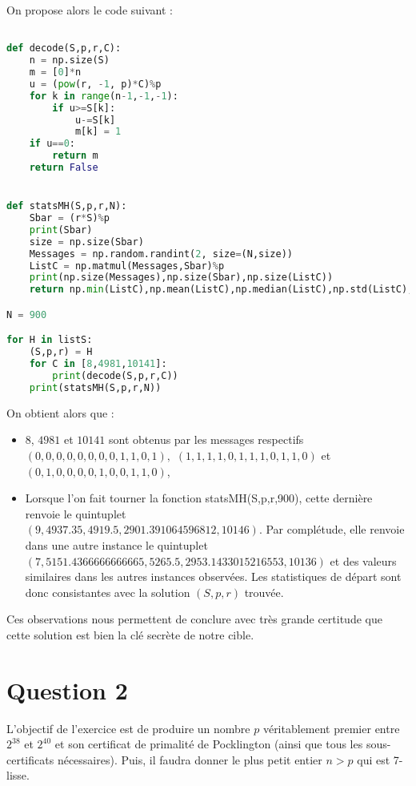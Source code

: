 \documentclass{article}
\begin{document}
On propose alors le code suivant :

\begin{lstlisting}[language = Python]

def decode(S,p,r,C):
    n = np.size(S)
    m = [0]*n
    u = (pow(r, -1, p)*C)%p
    for k in range(n-1,-1,-1):
        if u>=S[k]:
            u-=S[k]
            m[k] = 1
    if u==0:
        return m
    return False


def statsMH(S,p,r,N):
    Sbar = (r*S)%p
    print(Sbar)
    size = np.size(Sbar)
    Messages = np.random.randint(2, size=(N,size))
    ListC = np.matmul(Messages,Sbar)%p
    print(np.size(Messages),np.size(Sbar),np.size(ListC))
    return np.min(ListC),np.mean(ListC),np.median(ListC),np.std(ListC),np.max(ListC)

N = 900

for H in listS:
    (S,p,r) = H
    for C in [8,4981,10141]:
        print(decode(S,p,r,C))
    print(statsMH(S,p,r,N))

\end{lstlisting}

On obtient alors que :
\begin{itemize}
    \item $8$, $4981$ et $10141$ sont obtenus par les messages respectifs $(0, 0, 0, 0, 0, 0, 0, 0, 1, 1, 0, 1),$ $(1, 1, 1, 1, 0, 1, 1, 1, 0, 1, 1, 0)$ et $(0, 1, 0, 0, 0, 0, 1, 0, 0, 1, 1, 0)$,
    \item Lorsque l'on fait tourner la fonction statsMH(S,p,r,900), cette dernière renvoie le quintuplet\\ $(9, 4937.35, 4919.5, 2901.391064596812, 10146)$. Par complétude, elle renvoie dans une autre instance le quintuplet $(7, 5151.4366666666665, 5265.5, 2953.1433015216553, 10136)$ et des valeurs similaires dans les autres instances observées. Les statistiques de départ sont donc consistantes avec la solution $(S,p,r)$ trouvée.
    \end{itemize}
    Ces observations nous permettent de conclure avec très grande certitude que cette solution est bien la clé secrète de notre cible.


\newpage
\section{Question 2}

L'objectif de l'exercice est de produire un nombre $p$ véritablement premier entre $2^{38}$ et $2^{40}$ et son certificat de primalité de Pocklington (ainsi que tous les sous-certificats nécessaires). Puis, il faudra donner le plus petit entier $n > p$ qui est 7-lisse.
\end{document}
